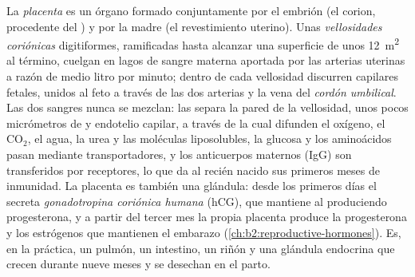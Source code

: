 \begin{definition}[La placenta]\label{def:b2:mammal-reproduction:placenta}
La \emph{placenta} es un órgano formado conjuntamente por el embrión (el
corion, procedente del ) y por la madre (el revestimiento
uterino). Unas \emph{vellosidades coriónicas} digitiformes, ramificadas
hasta alcanzar una superficie de unos \qty{12}{m^2} al término, cuelgan
en lagos de sangre materna aportada por las arterias uterinas a razón de
medio litro por minuto; dentro de cada vellosidad discurren capilares
fetales, unidos al feto a través de las dos arterias y la vena del
\emph{cordón umbilical}. Las dos sangres nunca se mezclan: las separa la
pared de la vellosidad, unos pocos micrómetros de  y endotelio
capilar, a través de la cual difunden el oxígeno, el
$\mathrm{CO_2}$, el agua, la urea y las moléculas liposolubles, la
glucosa y los aminoácidos pasan mediante transportadores, y los
anticuerpos maternos (IgG) son transferidos por receptores, lo que da al
recién nacido sus primeros meses de inmunidad. La placenta es también una
glándula: desde los primeros días el  secreta
\emph{gonadotropina coriónica humana} (hCG), que mantiene al 
produciendo progesterona, y a partir del tercer mes la propia placenta
produce la progesterona y los estrógenos que mantienen el embarazo
(\cref{ch:b2:reproductive-hormones}). Es, en la práctica, un pulmón, un
intestino, un riñón y una glándula endocrina que crecen durante nueve
meses y se desechan en el parto.
\end{definition}
